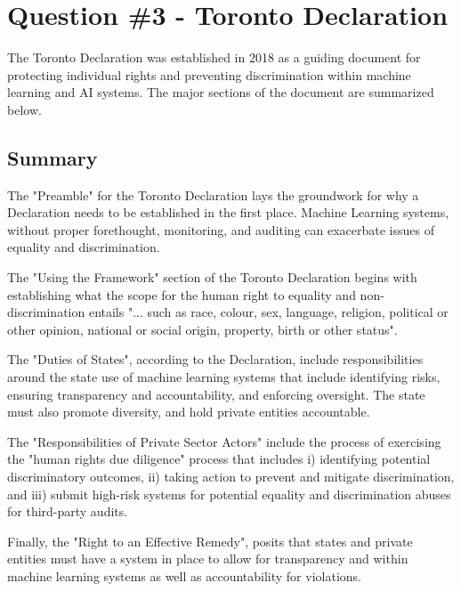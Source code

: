 \documentclass[
	letterpaper, %
]{jdf}
\begin{document}
\section{Question \#3 - Toronto Declaration}
The Toronto Declaration was established in 2018 as a guiding document for protecting individual rights and preventing discrimination within machine learning and AI systems. The major sections of the document are summarized below.
\subsection{Summary}
The "Preamble" for the Toronto Declaration lays the groundwork for why a Declaration needs to be established in the first place. Machine Learning systems, without proper forethought, monitoring, and auditing can exacerbate issues of equality and discrimination.

The "Using the Framework" section of the Toronto Declaration begins with establishing what the scope for the human right to equality and non-discrimination entails "... such as race, colour, sex, language, religion, political or other opinion, national or social origin, property, birth or other status".

The "Duties of States", according to the Declaration, include responsibilities around the state use of machine learning systems that include identifying risks, ensuring transparency and accountability, and enforcing oversight. The state must also promote diversity, and hold private entities accountable.

The "Responsibilities of Private Sector Actors" include the process of exercising the "human rights due diligence" process that includes i) identifying potential discriminatory outcomes, ii) taking action to prevent and mitigate discrimination, and iii) submit high-risk systems for potential equality and discrimination abuses for third-party audits.

Finally, the "Right to an Effective Remedy", posits that states and private entities must have a system in place to allow for transparency and within machine learning systems as well as accountability for violations.
\end{document}
